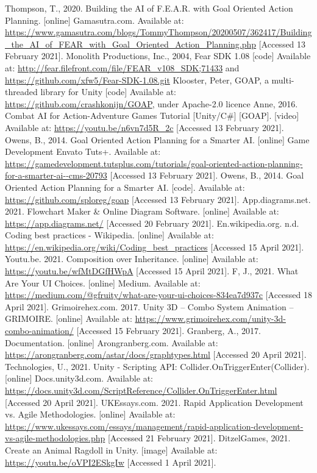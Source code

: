 \documentclass[12pt]{report}
\begin{document}
\begin{thebibliography}{}
    Thompson, T., 2020. Building the AI of F.E.A.R. with Goal Oriented Action Planning. [online] Gamasutra.com. Available at: \url{https://www.gamasutra.com/blogs/TommyThompson/20200507/362417/Building_the_AI_of_FEAR_with_Goal_Oriented_Action_Planning.php} [Accessed 13 February 2021].
    Monolith Productions, Inc., 2004, Fear SDK 1.08 [code] Available at: \url{http://fear.filefront.com/file/FEAR_v108_SDK;71433} and \url{https://github.com/xfw5/Fear-SDK-1.08.git}
    Klooster, Peter, GOAP, a multi-threaded library for Unity [code] Available at: \url{https://github.com/crashkonijn/GOAP}, under Apache-2.0 licence
    Anne, 2016. Combat AI for Action-Adventure Games Tutorial [Unity/C\#] [GOAP]. [video] Available at: \url{https://youtu.be/n6vn7d5R_2c} [Accessed 13 February 2021].
    Owens, B., 2014. Goal Oriented Action Planning for a Smarter AI. [online] Game Development Envato Tuts+. Available at: \url{https://gamedevelopment.tutsplus.com/tutorials/goal-oriented-action-planning-for-a-smarter-ai--cms-20793} [Accessed 13 February 2021].
    Owens, B., 2014. Goal Oriented Action Planning for a Smarter AI. [code]. Available at: \url{https://github.com/sploreg/goap} [Accessed 13 February 2021].
    App.diagrams.net. 2021. Flowchart Maker \& Online Diagram Software. [online] Available at: \url{https://app.diagrams.net/} [Accessed 20 February 2021].
    En.wikipedia.org. n.d. Coding best practices - Wikipedia. [online] Available at: \url{https://en.wikipedia.org/wiki/Coding_best_practices} [Accessed 15 April 2021].
    Youtu.be. 2021. Composition over Inheritance. [online] Available at: \url{https://youtu.be/wfMtDGfHWpA} [Accessed 15 April 2021].
    F, J., 2021. What Are Your UI Choices. [online] Medium. Available at: \url{https://medium.com/@gfruity/what-are-your-ui-choices-834ea7d937c} [Accessed 18 April 2021].
    Grimoirehex.com. 2017. Unity 3D – Combo System Animation – GRIMOIRE. [online] Available at: \url{https://www.grimoirehex.com/unity-3d-combo-animation/} [Accessed 15 February 2021].
    Granberg, A., 2017. Documentation. [online] Arongranberg.com. Available at: \url{https://arongranberg.com/astar/docs/graphtypes.html} [Accessed 20 April 2021].
    Technologies, U., 2021. Unity - Scripting API: Collider.OnTriggerEnter(Collider). [online] Docs.unity3d.com. Available at: \url{https://docs.unity3d.com/ScriptReference/Collider.OnTriggerEnter.html} [Accessed 20 April 2021].
    UKEssays.com. 2021. Rapid Application Development vs. Agile Methodologies. [online] Available at: \url{https://www.ukessays.com/essays/management/rapid-application-development-vs-agile-methodologies.php} [Accessed 21 February 2021].
    DitzelGames, 2021. Create an Animal Ragdoll in Unity. [image] Available at: \url{https://youtu.be/oVPI2ESkgIw} [Accessed 1 April 2021].
\end{thebibliography}
\end{document}
